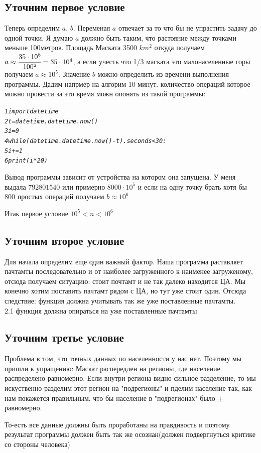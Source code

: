 \documentclass[12pt]{article} %
\begin{document}
 	\subsection{Уточним первое условие}
 	\hspace*{10mm}Теперь определим \(a\), \(b\). Переменая $a$ отвечает за то что бы не упрастить задачу до одной точки. Я думаю $a$ должно быть таким, что растояние между точками меньше 100метров. Площадь Маската 3500 $km^2$ откуда получаем $a\approx \cfrac{35\cdot 10^8}{100^2} =35 \cdot 10^4   $, а если учесть что 1/3 маската это малонаселенные горы получаем $a \approx 10^5$. Значение $b$ можно определить из времени выполнения программы. Дадим напрмер на алгорим 10 минут. количество операций которое можно провести за это время можн опонять из такой программы:\\
 	\begin{alltt}
 		\textit{1 import datetime
 		2 t = datetime.datetime.now()
 		3 i = 0
 		4 while (datetime.datetime.now() - t).seconds < 30:
 		5     i += 1
 		6 print(i * 20)}
 	\end{alltt}
 	Вывод программы зависит от устройства на котором она запущена. У меня выдала $792801540$ или  примерно $8000 \cdot 10^5$ и если на одну точку брать хотя бы 800 простых операций получаем $b \approx10^6$ \par
 	Итак первое условие $10^5<n<10^6$
 	\subsection{Уточним второе условие}
 	\hspace*{10mm} Для начала определим еще один важный фактор. Наша программа раставляет пачтамты последовательно и от наиболее загруженного к наименее загруженому, отсюда получаем ситуацию: стоит почтамт и не так далеко находится ЦА. Мы конечно хотим поставить пачтамт рядом с ЦА, но тут уже стоит один. Отсюда следствие: функция должна учитывать так же уже поставленные пачтамты. \\
 	\hspace*{5mm}2.1 функция должна опираться на уже поставленные пачтамты 
 	\subsection{Уточним третье условие}
 	\hspace*{1cm}Проблема в том, что точных данных по населенности у нас нет. Поэтому мы пришли к упращению: Маскат распередлен на регионы, где население распределено равномерно. Если внутри региона видно сильное разделение, то мы искуственно разделим этот регион на "подрегионы" и пделим население так, как нам покажется правильным, что бы население в "подрегионах" было $\pm$ равномерно.\par
 	То-есть все данные должны быть проработаны на правдивость и поэтому результат программы должен быть так же осознан(должен подвергнуться критике со стороны человека) 
\end{document}
